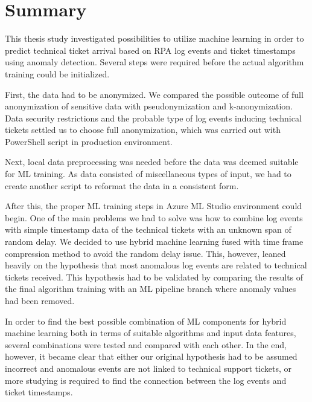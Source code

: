 
\section{Summary}\label{sec:summary}

This thesis study investigated possibilities to utilize machine learning
in order to predict technical ticket arrival
based on RPA log events and ticket timestamps
using anomaly detection.
Several steps were required before the actual algorithm training could be initialized.

First,
the data had to be anonymized.
We compared the possible outcome of full anonymization of sensitive data
with pseudonymization and k-anonymization.
Data security restrictions and the probable type of log events inducing technical tickets
settled us to choose full anonymization,
which was carried out with PowerShell script in production environment.

Next,
local data preprocessing was needed
before the data was deemed suitable for ML training.
As data consisted of miscellaneous types of input,
we had to create another script to reformat the data in a consistent form.

After this,
the proper ML training steps in Azure ML Studio environment could begin.
One of the main problems we had to solve
was how to combine log events with simple timestamp data of the technical tickets
with an unknown span of random delay.
We decided to use hybrid machine learning
fused with time frame compression method
to avoid the random delay issue.
This, however,
leaned heavily on the hypothesis that most anomalous log events
are related to technical tickets received.
This hypothesis had to be validated
by comparing the results of the final algorithm training
with an ML pipeline branch where anomaly values had been removed.

In order to find the best possible combination of ML components for hybrid machine learning
both in terms of suitable algorithms and input data features,
several combinations were tested and compared with each other.
In the end, however,
it became clear that
either our original hypothesis had to be assumed incorrect
and anomalous events are not linked to technical support tickets,
or more studying is required to find the connection between the log events and ticket timestamps.




\clearpage